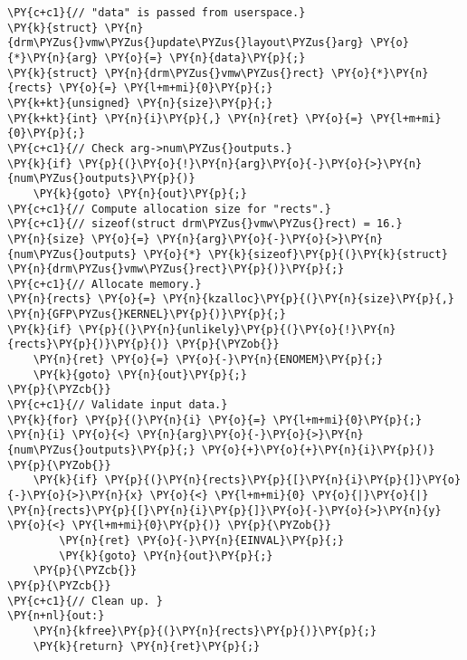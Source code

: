 \begin{Verbatim}[commandchars=\\\{\}]
\PY{c+c1}{// "data" is passed from userspace.}
\PY{k}{struct} \PY{n}{drm\PYZus{}vmw\PYZus{}update\PYZus{}layout\PYZus{}arg} \PY{o}{*}\PY{n}{arg} \PY{o}{=} \PY{n}{data}\PY{p}{;}
\PY{k}{struct} \PY{n}{drm\PYZus{}vmw\PYZus{}rect} \PY{o}{*}\PY{n}{rects} \PY{o}{=} \PY{l+m+mi}{0}\PY{p}{;}
\PY{k+kt}{unsigned} \PY{n}{size}\PY{p}{;}
\PY{k+kt}{int} \PY{n}{i}\PY{p}{,} \PY{n}{ret} \PY{o}{=} \PY{l+m+mi}{0}\PY{p}{;}
\PY{c+c1}{// Check arg->num\PYZus{}outputs.}
\PY{k}{if} \PY{p}{(}\PY{o}{!}\PY{n}{arg}\PY{o}{-}\PY{o}{>}\PY{n}{num\PYZus{}outputs}\PY{p}{)}
	\PY{k}{goto} \PY{n}{out}\PY{p}{;}
\PY{c+c1}{// Compute allocation size for "rects".}
\PY{c+c1}{// sizeof(struct drm\PYZus{}vmw\PYZus{}rect) = 16.}
\PY{n}{size} \PY{o}{=} \PY{n}{arg}\PY{o}{-}\PY{o}{>}\PY{n}{num\PYZus{}outputs} \PY{o}{*} \PY{k}{sizeof}\PY{p}{(}\PY{k}{struct} \PY{n}{drm\PYZus{}vmw\PYZus{}rect}\PY{p}{)}\PY{p}{;}
\PY{c+c1}{// Allocate memory.}
\PY{n}{rects} \PY{o}{=} \PY{n}{kzalloc}\PY{p}{(}\PY{n}{size}\PY{p}{,} \PY{n}{GFP\PYZus{}KERNEL}\PY{p}{)}\PY{p}{;}
\PY{k}{if} \PY{p}{(}\PY{n}{unlikely}\PY{p}{(}\PY{o}{!}\PY{n}{rects}\PY{p}{)}\PY{p}{)} \PY{p}{\PYZob{}}
	\PY{n}{ret} \PY{o}{=} \PY{o}{-}\PY{n}{ENOMEM}\PY{p}{;}
	\PY{k}{goto} \PY{n}{out}\PY{p}{;}
\PY{p}{\PYZcb{}}
\PY{c+c1}{// Validate input data.}
\PY{k}{for} \PY{p}{(}\PY{n}{i} \PY{o}{=} \PY{l+m+mi}{0}\PY{p}{;} \PY{n}{i} \PY{o}{<} \PY{n}{arg}\PY{o}{-}\PY{o}{>}\PY{n}{num\PYZus{}outputs}\PY{p}{;} \PY{o}{+}\PY{o}{+}\PY{n}{i}\PY{p}{)} \PY{p}{\PYZob{}}
	\PY{k}{if} \PY{p}{(}\PY{n}{rects}\PY{p}{[}\PY{n}{i}\PY{p}{]}\PY{o}{-}\PY{o}{>}\PY{n}{x} \PY{o}{<} \PY{l+m+mi}{0} \PY{o}{|}\PY{o}{|} \PY{n}{rects}\PY{p}{[}\PY{n}{i}\PY{p}{]}\PY{o}{-}\PY{o}{>}\PY{n}{y} \PY{o}{<} \PY{l+m+mi}{0}\PY{p}{)} \PY{p}{\PYZob{}}
		\PY{n}{ret} \PY{o}{-}\PY{n}{EINVAL}\PY{p}{;}
		\PY{k}{goto} \PY{n}{out}\PY{p}{;}
	\PY{p}{\PYZcb{}}
\PY{p}{\PYZcb{}}
\PY{c+c1}{// Clean up. }
\PY{n+nl}{out:}
	\PY{n}{kfree}\PY{p}{(}\PY{n}{rects}\PY{p}{)}\PY{p}{;}
	\PY{k}{return} \PY{n}{ret}\PY{p}{;}
\end{Verbatim}
